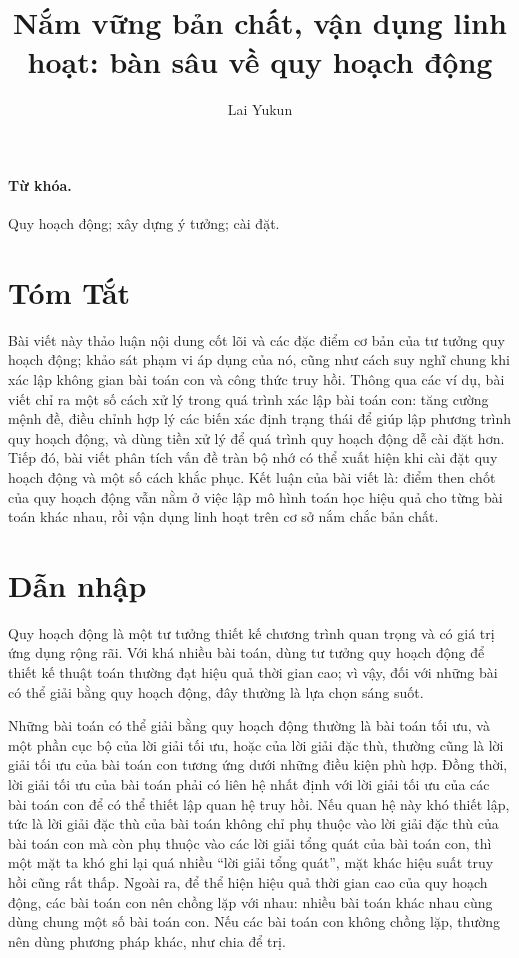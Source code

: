 \documentclass[11pt]{article}
\title{Nắm vững bản chất, vận dụng linh hoạt: bàn sâu về quy hoạch động}
\author{Lai Yukun}
\date{}
\begin{document}
\maketitle


\paragraph{Từ khóa.}
Quy hoạch động; xây dựng ý tưởng; cài đặt.

\section*{Tóm Tắt}

Bài viết này thảo luận nội dung cốt lõi và các đặc điểm cơ bản của tư tưởng
quy hoạch động; khảo sát phạm vi áp dụng của nó, cũng như cách suy nghĩ chung
khi xác lập không gian bài toán con và công thức truy hồi. Thông qua các ví
dụ, bài viết chỉ ra một số cách xử lý trong quá trình xác lập bài toán con:
tăng cường mệnh đề, điều chỉnh hợp lý các biến xác định trạng thái để giúp
lập phương trình quy hoạch động, và dùng tiền xử lý để quá trình quy hoạch
động dễ cài đặt hơn. Tiếp đó, bài viết phân tích vấn đề tràn bộ nhớ có thể
xuất hiện khi cài đặt quy hoạch động và một số cách khắc phục. Kết luận của
bài viết là: điểm then chốt của quy hoạch động vẫn nằm ở việc lập mô hình
toán học hiệu quả cho từng bài toán khác nhau, rồi vận dụng linh hoạt trên cơ
sở nắm chắc bản chất.

\section{Dẫn nhập}

Quy hoạch động là một tư tưởng thiết kế chương trình quan trọng và có giá trị
ứng dụng rộng rãi. Với khá nhiều bài toán, dùng tư tưởng quy hoạch động để
thiết kế thuật toán thường đạt hiệu quả thời gian cao; vì vậy, đối với những
bài có thể giải bằng quy hoạch động, đây thường là lựa chọn sáng suốt.

Những bài toán có thể giải bằng quy hoạch động thường là bài toán tối ưu, và
một phần cục bộ của lời giải tối ưu, hoặc của lời giải đặc thù, thường cũng là
lời giải tối ưu của bài toán con tương ứng dưới những điều kiện phù hợp. Đồng
thời, lời giải tối ưu của bài toán phải có liên hệ nhất định với lời giải tối
ưu của các bài toán con để có thể thiết lập quan hệ truy hồi. Nếu quan hệ này
khó thiết lập, tức là lời giải đặc thù của bài toán không chỉ phụ thuộc vào
lời giải đặc thù của bài toán con mà còn phụ thuộc vào các lời giải tổng quát
của bài toán con, thì một mặt ta khó ghi lại quá nhiều ``lời giải tổng quát'',
mặt khác hiệu suất truy hồi cũng rất thấp. Ngoài ra, để thể hiện hiệu quả
thời gian cao của quy hoạch động, các bài toán con nên chồng lặp với nhau:
nhiều bài toán khác nhau cùng dùng chung một số bài toán con. Nếu các bài toán
con không chồng lặp, thường nên dùng phương pháp khác, như chia để trị.
\end{document}
